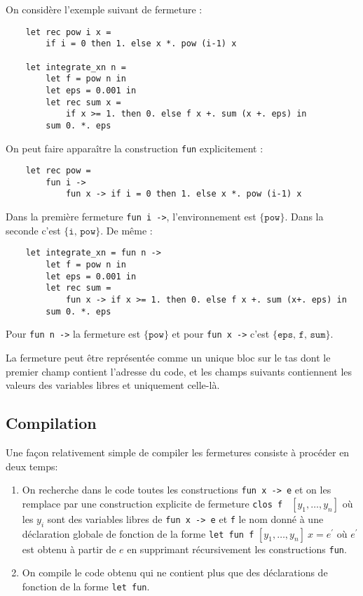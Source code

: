 \documentclass{cours}
\begin{document}
On considère l'exemple suivant de fermeture :
\begin{verbatim}
    let rec pow i x =
        if i = 0 then 1. else x *. pow (i-1) x
    
    let integrate_xn n =
        let f = pow n in
        let eps = 0.001 in
        let rec sum x =
            if x >= 1. then 0. else f x +. sum (x +. eps) in
        sum 0. *. eps
\end{verbatim}
On peut faire apparaître la construction \texttt{fun} explicitement :
\begin{verbatim}
    let rec pow =
        fun i ->
            fun x -> if i = 0 then 1. else x *. pow (i-1) x
\end{verbatim}

Dans la première fermeture \texttt{fun i ->}, l'environnement est $\{\texttt{pow}\}$. Dans la seconde c'est $\{\texttt{i, pow}\}$. De même :
\begin{verbatim}
    let integrate_xn = fun n ->
        let f = pow n in
        let eps = 0.001 in
        let rec sum = 
            fun x -> if x >= 1. then 0. else f x +. sum (x+. eps) in
        sum 0. *. eps
\end{verbatim}
Pour \texttt{fun n ->} la fermeture est $\{\texttt{pow}\}$ et pour \texttt{fun x ->} c'est $\{\texttt{eps, f, sum}\}$.


La fermeture peut être représentée comme un unique bloc sur le tas dont le premier champ contient l'adresse du code, et les champs suivants contiennent les valeurs des variables libres et uniquement celle-là.

\subsection{Compilation}
Une façon relativement simple de compiler les fermetures consiste à procéder en deux temps:
\begin{enumerate}
    \item On recherche dans le code toutes les constructions \texttt{fun x -> e} et on les remplace par une construction explicite de fermeture \texttt{clos f } $[y_{1}, \ldots, y_{n}]$ où les $y_{i}$ sont des variables libres de \texttt{fun x -> e} et \texttt{f} le nom donné à une déclaration globale de fonction de la forme \texttt{let fun f} $[y_{1}, \ldots, y_{n}]\ x = e^{'}$ où $e^{'}$ est obtenu à partir de $e$ en supprimant récursivement les constructions \texttt{fun}.
    \item On compile le code obtenu qui ne contient plus que des déclarations de fonction de la forme \texttt{let fun}.
\end{enumerate}
\end{document}
